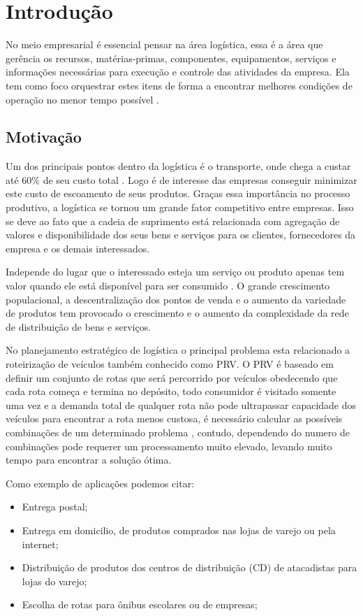 \chapter[Introdução]{Introdução}

No meio empresarial é essencial pensar na área logística, essa é a área que gerência os recursos, matérias-primas, componentes, equipamentos, serviços e informações necessárias para execução e controle das atividades da empresa. 
Ela tem como foco orquestrar estes itens de forma a encontrar melhores condições de operação no menor tempo possível \cite{DIAS}.

\section{Motivação}

Um dos principais pontos dentro da logística é o transporte, onde chega a custar até 60\% de seu custo total \cite{RODRIGUES}.
Logo é de interesse das empresas conseguir minimizar este custo de escoamento de seus produtos. Graças essa importância no processo produtivo, a logística se tornou um grande fator competitivo entre empresas.
Isso se deve ao fato que a cadeia de suprimento está relacionada com agregação de valores e disponibilidade dos seus bens e serviços para os clientes, fornecedores da empresa e os demais interessados. 

Independe do lugar que o interessado esteja um serviço ou produto apenas tem valor quando ele está disponível para ser consumido \cite{TSUDA}.
O grande crescimento populacional, a descentralização dos pontos de venda e o aumento da variedade de produtos tem provocado o crescimento e o aumento da complexidade da rede de distribuição de bens e serviços.

No planejamento estratégico de logística o principal problema esta relacionado a roteirização de veículos \cite{TSUDA} também conhecido como PRV\@.
O PRV é baseado em definir um conjunto de rotas que será percorrido por veículos obedecendo que cada rota começa e termina no depósito, todo consumidor é visitado somente uma vez e a demanda total de qualquer rota não pode ultrapassar capacidade dos veículos para encontrar a rota menos custosa, é necessário calcular as possíveis combinações de um determinado problema , contudo, dependendo do numero de combinações pode requerer um processamento muito elevado, levando muito tempo para encontrar a solução ótima.

Como exemplo de aplicações podemos citar:
\begin{itemize}
	\item Entrega postal;
	\item Entrega em domicilio, de produtos comprados nas lojas de varejo ou pela internet;
	\item Distribuição de produtos dos centros de distribuição (CD) de atacadistas para lojas do varejo;
	\item Escolha de rotas para ônibus escolares ou de empresas;
\end{itemize}

